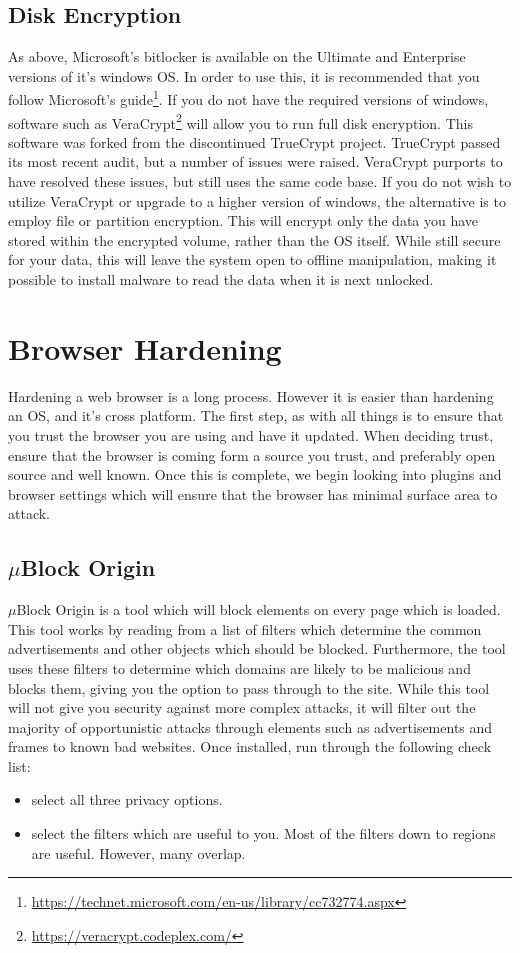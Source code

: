 \documentclass[a4paper,11pt]{report}
\begin{document}
		\subsection{Disk Encryption}
			As above, Microsoft's bitlocker is available on the Ultimate and Enterprise versions of it's windows OS.
			In order to use this, it is recommended that you follow Microsoft's guide\footnote{\url{https://technet.microsoft.com/en-us/library/cc732774.aspx}}. 
			If you do not have the required versions of windows, software such as VeraCrypt\footnote{\url{https://veracrypt.codeplex.com/}} will allow you to run full disk encryption. 
			This software was forked from the discontinued TrueCrypt project. 
			TrueCrypt passed its most recent audit, but a number of issues were raised.
			VeraCrypt purports to have resolved these issues, but still uses the same code base. 
			If you do not wish to utilize VeraCrypt or upgrade to a higher version of windows, the alternative is to employ file or partition encryption. 
			This will encrypt only the data you have stored within the encrypted volume, rather than the OS itself. 
			While still secure for your data, this will leave the system open to offline manipulation,
			making it possible to install malware to read the data when it is next unlocked. 
	\section{Browser Hardening}
		Hardening a web browser is a long process. However it is easier than hardening an OS, and it's cross platform. 
		The first step, as with all things is to ensure that you trust the browser you are using and have it updated. 
		When deciding trust, ensure that the browser is coming form a source you trust, and preferably open source and well known. 
		Once this is complete, we begin looking into plugins and browser settings which will ensure that the browser has minimal surface area to attack. 
		\subsection{$\mu{}$Block Origin}
			$\mu$Block Origin is a tool which will block elements on every page which is loaded. 
			This tool works by reading from a list of filters which determine the common advertisements and other objects which should be blocked. 
			Furthermore, the tool uses these filters to determine which domains are likely to be malicious and blocks them, giving you the option to pass through to the site. 
			While this tool will not give you security against more complex attacks, it will filter out the majority of opportunistic attacks through elements such as advertisements and frames to known bad websites. 
			Once installed, run through the following check list: 
			\begin{itemize}
				\item select all three privacy options.
				\item select the filters which are useful to you. 
					Most of the filters down to regions are useful. However, many overlap. 
			\end{itemize}
\end{document}
